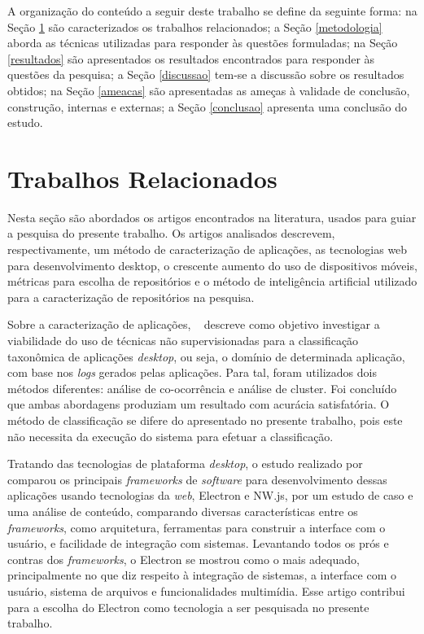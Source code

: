 \documentclass[12pt]{article}
\begin{document}
A organização do conteúdo a seguir deste trabalho se define da seguinte forma: na Seção \ref{trabalhosrelacionados} são caracterizados os trabalhos relacionados; a Seção \ref{metodologia} aborda as técnicas utilizadas para responder às questões formuladas; na Seção \ref{resultados} são apresentados os resultados encontrados para responder às questões da pesquisa; a Seção \ref{discussao} tem-se a discussão sobre os resultados obtidos; na Seção \ref{ameacas} são apresentadas as ameças à validade de conclusão, construção, internas e externas; a Seção \ref{conclusao} apresenta uma conclusão do estudo.

\section{Trabalhos Relacionados} \label{trabalhosrelacionados}

Nesta seção são abordados os artigos encontrados na literatura, usados para guiar a pesquisa do presente trabalho. Os artigos analisados descrevem, respectivamente, um método de caracterização de aplicações, as tecnologias web para desenvolvimento desktop, o crescente aumento do uso de dispositivos móveis, métricas para escolha de repositórios e o método de inteligência artificial utilizado para a caracterização de repositórios na pesquisa. 

Sobre a caracterização de aplicações, ~\cite{4561878} descreve como objetivo investigar a viabilidade do uso de técnicas não supervisionadas para a classificação taxonômica de aplicações \textit{desktop}, ou seja, o domínio de determinada aplicação, com base nos \textit{logs} gerados pelas aplicações. Para tal, foram utilizados dois métodos diferentes: análise de co-ocorrência e análise de cluster. Foi concluído que ambas abordagens produziam um resultado com acurácia satisfatória. O método de classificação se difere do apresentado no presente trabalho, pois este não necessita da execução do sistema para efetuar a classificação.

Tratando das tecnologias de plataforma \textit{desktop}, o estudo realizado por~\cite{toman2019depth} comparou os principais \textit{frameworks} de \textit{software} para desenvolvimento dessas aplicações usando tecnologias da \textit{web}, Electron e NW.js, por um estudo de caso e uma análise de conteúdo, comparando diversas características entre os \textit{frameworks}, como arquitetura, ferramentas para construir a interface com o usuário, e facilidade de integração com sistemas. Levantando todos os prós e contras dos \textit{frameworks}, o Electron se mostrou como o mais adequado, principalmente no que diz respeito à integração de sistemas, a interface com o usuário, sistema de arquivos e funcionalidades multimídia. Esse artigo contribui para a escolha do Electron como tecnologia a ser pesquisada no presente trabalho.
\end{document}

